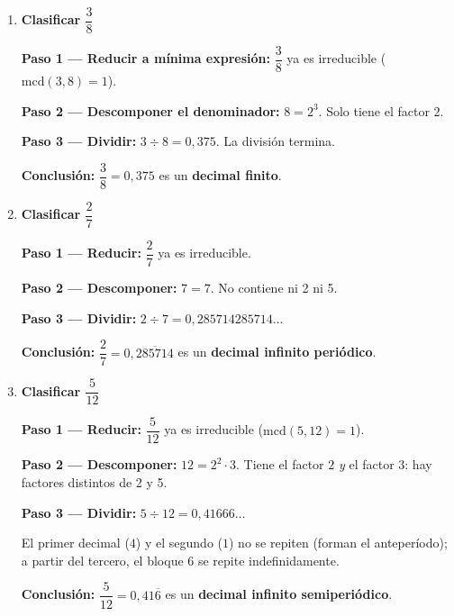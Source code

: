 \documentclass[11pt, letterpaper]{article}
\begin{document}
\begin{tcolorbox}[examplebox, title={Ejemplos --- clasificar la representaci\'on decimal}]
\begin{enumerate}[label=\textbf{Ej. \arabic*.}, leftmargin=*, itemsep=14pt]

\item \textbf{Clasificar $\dfrac{3}{8}$}

\textbf{Paso 1 --- Reducir a m\'inima expresi\'on:} $\dfrac{3}{8}$ ya es irreducible ($\text{mcd}(3,8)=1$).

\textbf{Paso 2 --- Descomponer el denominador:} $8 = 2^3$. Solo tiene el factor $2$.

\textbf{Paso 3 --- Dividir:} $3 \div 8 = 0{,}375$. La divisi\'on termina.

\textbf{Conclusi\'on:} $\dfrac{3}{8} = 0{,}375$ es un \textbf{decimal finito}. \checkmark

\item \textbf{Clasificar $\dfrac{2}{7}$}

\textbf{Paso 1 --- Reducir:} $\dfrac{2}{7}$ ya es irreducible.

\textbf{Paso 2 --- Descomponer:} $7 = 7$. No contiene ni 2 ni 5.

\textbf{Paso 3 --- Dividir:} $2 \div 7 = 0{,}285714285714\ldots$

\textbf{Conclusi\'on:} $\dfrac{2}{7} = 0{,}\overline{285714}$ es un \textbf{decimal infinito peri\'odico}. \checkmark

\item \textbf{Clasificar $\dfrac{5}{12}$}

\textbf{Paso 1 --- Reducir:} $\dfrac{5}{12}$ ya es irreducible ($\text{mcd}(5,12)=1$).

\textbf{Paso 2 --- Descomponer:} $12 = 2^2 \cdot 3$. Tiene el factor $2$ \textit{y} el factor $3$: hay factores distintos de 2 y 5.

\textbf{Paso 3 --- Dividir:} $5 \div 12 = 0{,}41666\ldots$

El primer decimal ($4$) y el segundo ($1$) no se repiten (forman el anteper\'iodo); a partir del tercero, el bloque $6$ se repite indefinidamente.

\textbf{Conclusi\'on:} $\dfrac{5}{12} = 0{,}41\overline{6}$ es un \textbf{decimal infinito semiperi\'odico}. \checkmark

\end{enumerate}
\end{tcolorbox}
\end{document}
